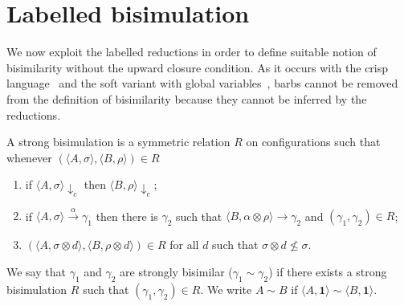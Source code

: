 \documentclass{llncs}
\def\monid{{\mathbf 0}}
\def\monid{\mathbf{1}}
\begin{document}
\section{Labelled bisimulation}
We now exploit the labelled reductions in order to define suitable notion of bisimilarity without the upward closure condition.
As it occurs with the crisp language~\cite{pippo} and the soft variant with global variables~\cite{festcatuscia}, 
barbs cannot be removed from the 
definition of bisimilarity because they cannot be inferred by the reductions.

\begin{definition}\label{def:strongbis} A strong bisimulation is a symmetric relation $R$ on configurations such that whenever
$( \langle A, \sigma \rangle,\langle B, \rho \rangle) \in R$
\begin{enumerate}
\item if $\langle A, \sigma \rangle \downarrow_c$ then $\langle B, \rho \rangle \downarrow_c$;
\item if $\langle A, \sigma \rangle \xrightarrow{\alpha} \gamma_1$ then there is $\gamma_2$ such that $\langle B, \alpha \otimes \rho \rangle \to \gamma_2$ 
and $(\gamma_1, \gamma_2) \in R$;
\item $(\langle A,\sigma \otimes d\rangle, \langle B,\rho \otimes d \rangle) \in R$ for  all $d$ such that $\sigma \otimes d \not \leq \sigma$. 
\end{enumerate}
We say that $\gamma_1$ and $\gamma_2$ are  strongly bisimilar ($\gamma_1  \sim \gamma_2$) if there exists a strong  bisimulation 
$R$ such that $(\gamma_1 , \gamma_2 ) \in R$. We write $A \sim B$ if $\langle A, \monid \rangle \sim \langle B, \monid \rangle$.
\end{definition}
\end{document}
